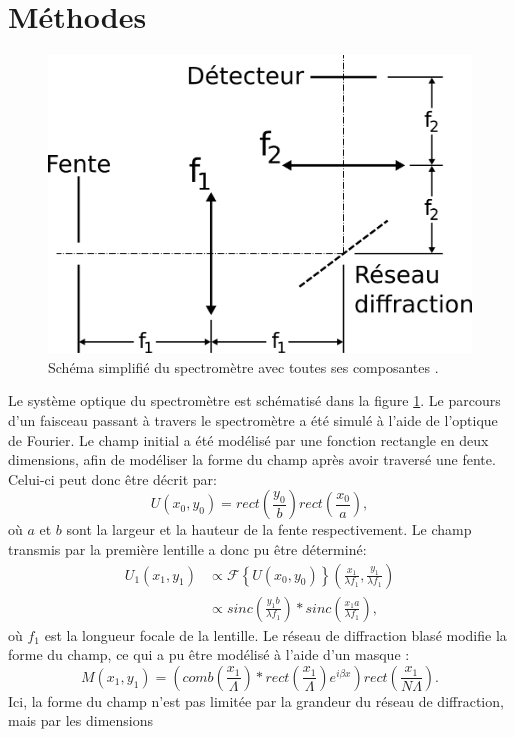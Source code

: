 \documentclass[conference]{IEEEtran}
\begin{document}
\section{Méthodes \label{methodes}}
\begin{figure}[H]
    \centering
    \includegraphics[scale=0.4]{4f.png}
    \caption{Schéma simplifié du spectromètre avec toutes ses composantes \cite{procedurier}. \label{4f}}
\end{figure}
Le système optique du spectromètre est schématisé dans la figure \ref{4f}.
Le parcours d'un faisceau passant à travers le spectromètre a été simulé à l'aide 
de l'optique de Fourier. Le champ initial a été modélisé par une fonction rectangle en deux dimensions,
afin de modéliser la forme du champ après avoir traversé une fente. Celui-ci peut donc être décrit par:
\[U(x_0,y_0)=rect(\frac{y_0}{b})rect(\frac{x_0}{a}),\]
où $a$ et $b$ sont la largeur et la hauteur de la fente respectivement. Le champ transmis par 
la première lentille a donc pu être déterminé:
\begin{align*}
    U_1(x_1,y_1)&\propto\mathscr{F}\left\{U(x_0,y_0)\right\}(\frac{x_1}{\lambda f_1},\frac{y_1}{\lambda f_1})\\
    &\propto sinc(\frac{y_1b}{\lambda f_1})\ast sinc(\frac{x_1a}{\lambda f_1}),
\end{align*}
où $f_1$ est la longueur focale de la lentille. Le réseau de diffraction blasé modifie la forme du champ, ce qui a pu être
modélisé à l'aide d'un masque \cite{procedurier}:
\[M(x_1,y_1)=(comb(\frac{x_1}{\Lambda})\ast rect(\frac{x_1}{\Lambda})e^{i\beta x})rect(\frac{x_1}{N\Lambda}).\]
Ici, la forme du champ n'est pas limitée par la grandeur du réseau de diffraction, mais par les dimensions
\end{document}
